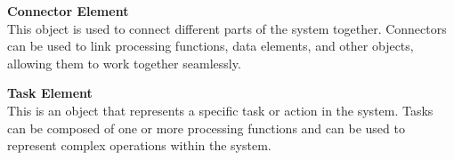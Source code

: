 \textbf{Connector Element}\\
This object is used to connect different parts of the system together. Connectors can be
used to link processing functions, data elements, and other objects, allowing them to work
together seamlessly.

\textbf{Task Element}\\
This is an object that represents a specific task or action in the system. Tasks can be
composed of one or more processing functions and can be used to represent complex
operations within the system.
